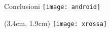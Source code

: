 \begin{frame}{Conclusioni}
	\vspace{-0.5cm}
	\centering\texttt{[image: android]}
	\begin{textblock*}{2cm}(3.4cm, 1.9cm)
		\texttt{[image: xrossa]}
	\end{textblock*}

\end{frame}